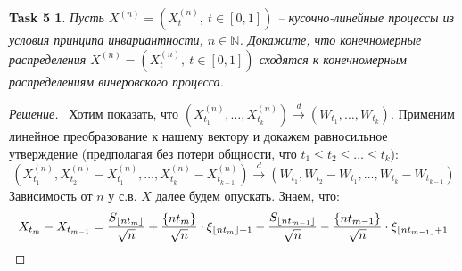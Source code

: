 \documentclass[12pt,a4paper]{extarticle}
\newtheorem*{task5}{Task 5}
\newcommand{\N}{\mathbb{N}}
\newcommand{\pd}{\xrightarrow{d}}
\begin{document}
\vspace{\baselineskip}

\begin{task5}
	Пусть $X^{(n)} = (X_t^{(n)},~ t \in [0, 1])$ -- кусочно-линейные процессы из условия принципа инвариантности, $n \in \N$. Докажите, что конечномерные распределения $X^{(n)} = (X_t^{(n)},~ t \in [0, 1])$ сходятся к конечномерным распределениям	винеровского процесса.
\end{task5}
\begin{proof}[Решение]
	\
	Хотим показать, что $(X_{t_1}^{(n)}, \ldots, X_{t_k}^{(n)} ) \pd (W_{t_1}, \ldots, W_{t_k})$. Применим линейное преобразование к нашему вектору и докажем равносильное утверждение (предполагая без потери общности, что $t_1 \leq t_2 \leq \ldots \leq t_k$):
	\[
		(X_{t_1}^{(n)}, X_{t_2}^{(n)} - X_{t_1}^{(n)}, \ldots, X_{t_k}^{(n)} - X_{t_{k-1}}^{(n)}) \pd (W_{t_1}, W_{t_2} - W_{t_1}, \ldots, W_{t_k} - W_{t_{k-1}})
	\]
	Зависимость от $n$ у с.в. $X$ далее будем опускать. Знаем, что:
	\[
		X_{t_m} - X_{t_{m-1}} = {S_{\lfloor n t_{m} \rfloor} \over \sqrt{n}} + {\{ n t_{m} \} \over \sqrt{n}} \cdot \xi_{\lfloor n t_{m} \rfloor + 1} - {S_{\lfloor n t_{m-1} \rfloor} \over \sqrt{n}} - {\{ n t_{m-1} \} \over \sqrt{n}} \cdot \xi_{\lfloor n t_{m-1} \rfloor + 1}
	\]
	

\end{proof}
\end{document}
